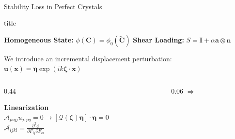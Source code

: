 \documentclass[10pt, aspectratio=169]{beamer}
\begin{document}
\begin{frame}{Stability Loss in Perfect Crystals}
    \vspace{0.4cm}
    \centering
    
    \begin{beamercolorbox}[wd=0.92\textwidth, rounded=true, center]{title}
        \centering \rule{0pt}{0.6cm}
        {\textbf{Homogeneous State:} \quad $\phi(\mathbf{C}) = \phi_0(\tilde{\mathbf{C}})$} \qquad 
        \vline \qquad
        {\textbf{Shear Loading:} \quad $S = \mathbf{I} + \alpha \mathbf{a} \otimes \mathbf{n}$}
        \rule[-0.5cm]{0pt}{0.6cm}
    \end{beamercolorbox}

    \vspace{0.7cm}
    {\small \color{gray} We introduce an incremental displacement perturbation:} \\
    \vspace{0.2cm}
    {\Large $\mathbf{u}(\mathbf{x}) = \boldsymbol{\eta} \exp(i k \boldsymbol{\zeta} \cdot \mathbf{x})$}

    \vspace{0.8cm}
    \begin{columns}[c, onlytextwidth]
        \begin{column}{0.44\textwidth}
            \centering
            \colorbox{AcademicNavy!5}{
                \begin{minipage}{0.95\linewidth}
                    \centering \rule{0pt}{0.35cm}
                    \textbf{\color{red!80!black} Linearization} \\
                    \vspace{0.2cm}
                    $\mathcal{A}_{piqj} u_{j,pq} = 0 \rightarrow [\mathcal{Q}(\boldsymbol{\zeta})\boldsymbol{\eta}] \cdot \boldsymbol{\eta}=0$ \\[0.05cm]
                    {\scriptsize $\mathcal{A}_{ijkl} = \frac{\partial^2 \phi}{\partial F_{ij} \partial F_{kl}}$}
                    \rule[-0.3cm]{0pt}{0.35cm}
                \end{minipage}
            }
        \end{column}
        
        \begin{column}{0.06\textwidth}
            \centering \Huge \color{AcademicNavy} $\Rightarrow$
        \end{column}
        

\end{columns}
\end{frame}
\end{document}
